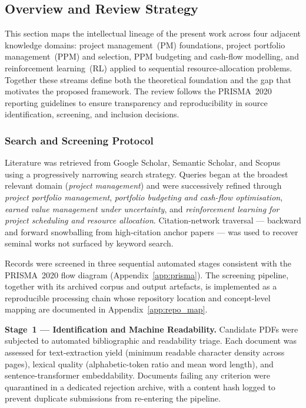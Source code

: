
\subsection{Overview and Review Strategy}
\label{subsec:lr_overview}

This section maps the intellectual lineage of the present work across
four adjacent knowledge domains: project management~(PM) foundations,
project portfolio management~(PPM) and selection, PPM budgeting and
cash-flow modelling, and reinforcement learning~(RL) applied to
sequential resource-allocation problems. Together these streams define
both the theoretical foundation and the gap that motivates the
proposed framework. The review follows the PRISMA~2020 reporting
guidelines \citep{Page2021} to ensure transparency and reproducibility
in source identification, screening, and inclusion decisions.

\subsubsection{Search and Screening Protocol}
\label{subsubsec:prisma}

Literature was retrieved from Google Scholar, Semantic Scholar, and
Scopus using a progressively narrowing search strategy. Queries began
at the broadest relevant domain (\emph{project management}) and were
successively refined through \emph{project portfolio management},
\emph{portfolio budgeting and cash-flow optimisation}, \emph{earned
value management under uncertainty}, and \emph{reinforcement learning
for project scheduling and resource allocation}. Citation-network
traversal --- backward and forward snowballing from high-citation
anchor papers --- was used to recover seminal works not surfaced by
keyword search.

Records were screened in three sequential automated stages consistent
with the PRISMA~2020 flow diagram (Appendix~\ref{app:prisma}). The
screening pipeline, together with its archived corpus and output
artefacts, is implemented as a reproducible processing chain whose
repository location and concept-level mapping are documented in
Appendix~\ref{app:repo_map}.

\medskip
\textbf{Stage~1 --- Identification and Machine Readability.}\;
Candidate PDFs were subjected to automated bibliographic and
readability triage. Each document was assessed for text-extraction
yield (minimum readable character density across pages), lexical
quality (alphabetic-token ratio and mean word length), and
sentence-transformer embeddability. Documents failing any criterion
were quarantined in a dedicated rejection archive, with a content
hash logged to prevent duplicate submissions from re-entering the
pipeline.

